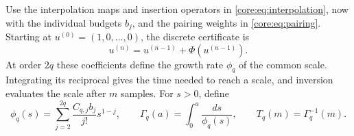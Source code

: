 \documentclass[11pt,a4paper]{article}
\theoremstyle{definition}\newtheorem{definition}[theorem]{Definition}
\theoremstyle{remark}\newtheorem{remark}[theorem]{Remark}
\numberwithin{equation}{section}
\begin{document}
Use the interpolation maps and insertion operators in
\eqref{core:eq:interpolation}, now with the individual budgets $b_j$,
and the pairing weights in \eqref{core:eq:pairing}.
Starting at $u^{(0)}=(1,0,\ldots,0)$, the discrete certificate is
\begin{equation}\label{core:eq:discrete}
 u^{(n)}=u^{(n-1)}+\Phi(u^{(n-1)}).
\end{equation}
At order $2q$ these coefficients define the growth rate $\phi_q$ of
the common scale. Integrating its reciprocal gives the time needed
to reach a scale, and inversion evaluates the scale after $m$ samples.
For $s>0$, define
\begin{equation}\label{core:eq:integral}
 \phi_q(s)=\sum_{j=2}^{2q}\frac{C_{q,j}b_j}{j!}s^{1-j},\qquad
 \Gamma_q(a)=\int_0^a\frac{ds}{\phi_q(s)},\qquad
 T_q(m)=\Gamma_q^{-1}(m).
\end{equation}
\end{document}
